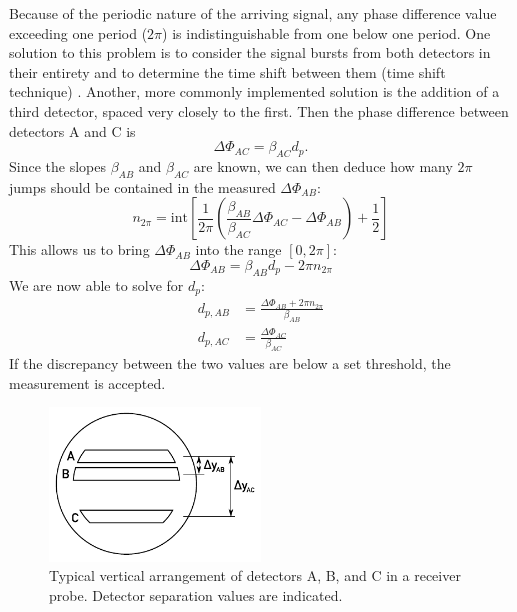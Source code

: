 \documentclass[11.5pt,oneside]{book}
\begin{document}
Because of the periodic nature of the arriving signal, any phase difference value
exceeding one period ($2\pi$) is indistinguishable from one below one period.
One solution to this problem is to consider the signal bursts from both
detectors in their entirety and to determine the time shift between them (time
shift technique) \cite{Albrecht03}. Another, more commonly implemented solution
is the addition of a third detector, spaced very closely to the first. Then the
phase difference between detectors A and C is
\begin{equation}
    \Delta \Phi_{AC} = \beta_{AC} d_p.
\end{equation}
Since the slopes $\beta_{AB}$ and $\beta_{AC}$ are known, we can then deduce how
many $2\pi$ jumps should be contained in the measured $\Delta \Phi_{AB}$:
\begin{equation}
    n_{2\pi} = \mathrm{int}\left[
        \frac{1}{2\pi}\left(\frac{\beta_{AB}}{\beta_{AC}} \Delta \Phi_{AC} -
    \Delta\Phi_{AB} \right) + \frac{1}{2}\right]
\end{equation}
This allows us to bring $\Delta\Phi_{AB}$ into the range $[0, 2\pi]$:
\begin{equation}
    \Delta\Phi_{AB} = \beta_{AB} d_p - 2\pi n_{2\pi}
\end{equation}
We are now able to solve for $d_p$:
\begin{align}
    d_{p,AB} &= \frac{\Delta\Phi_{AB} + 2\pi n_{2\pi}}{\beta_{AB}}\\
    d_{p,AC} &= \frac{\Delta\Phi_{AC}}{\beta_{AC}}
\end{align}
If the discrepancy between the two values are below a set threshold, the
measurement is accepted.

\begin{figure}
    \centering
    \includegraphics[width=0.5\textwidth]{img/setup/detector_arrangement.pdf}
    \caption{Typical vertical arrangement of detectors A, B, and C in a receiver
        probe. Detector separation values are indicated. \label{fig:pdpa-detector-arrangement}}
\end{figure}
\end{document}
